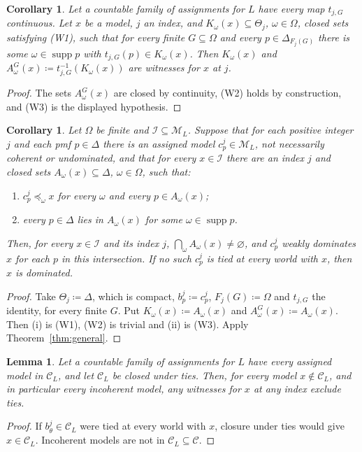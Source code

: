 \documentclass[11pt]{article}
\newtheorem{lemma}[theorem]{Lemma}
\newtheorem{corollary}[theorem]{Corollary}
\theoremstyle{definition}
\theoremstyle{remark}
\newcommand{\M}{\mathcal M}
\newcommand{\C}{\mathcal C}
\newcommand{\I}{\mathcal I}
\newcommand{\supp}{\operatorname{supp}}
\begin{document}
\begin{corollary}\label{cor:inverse}
Let a countable family of assignments for $L$ have every map $t_{j,G}$ continuous. Let $x$ be a model, $j$ an index, and $K_\omega(x)\subseteq\Theta_j$, $\omega\in\Omega$, closed sets satisfying (W1), such that for every finite $G\subseteq\Omega$ and every $p\in\Delta_{F_j(G)}$ there is some $\omega\in\supp p$ with $t_{j,G}(p)\in K_\omega(x)$. Then $K_\omega(x)$ and $A^G_\omega(x)\coloneqq t_{j,G}^{-1}(K_\omega(x))$ are witnesses for $x$ at $j$.
\end{corollary}
\begin{proof}
The sets $A^G_\omega(x)$ are closed by continuity, (W2) holds by construction, and (W3) is the displayed hypothesis.
\end{proof}

\begin{corollary}\label{cor:finite}
Let $\Omega$ be finite and $\I\subseteq\M_L$. Suppose that for each positive integer $j$ and each pmf $p\in\Delta$ there is an assigned model $c^j_p\in\M_L$, not necessarily coherent or undominated, and that for every $x\in\I$ there are an index $j$ and closed sets $A_\omega(x)\subseteq\Delta$, $\omega\in\Omega$, such that:
\begin{enumerate}[label=(\roman*)]
\item $c^j_p\preceq_\omega x$ for every $\omega$ and every $p\in A_\omega(x)$;
\item every $p\in\Delta$ lies in $A_\omega(x)$ for some $\omega\in\supp p$.
\end{enumerate}
Then, for every $x\in\I$ and its index $j$, $\bigcap_\omega A_\omega(x)\ne\varnothing$, and $c^j_p$ weakly dominates $x$ for each $p$ in this intersection. If no such $c^j_p$ is tied at every world with $x$, then $x$ is dominated.
\end{corollary}
\begin{proof}
Take $\Theta_j\coloneqq\Delta$, which is compact, $b^j_p\coloneqq c^j_p$, $F_j(G)\coloneqq\Omega$ and $t_{j,G}$ the identity, for every finite $G$. Put $K_\omega(x)\coloneqq A_\omega(x)$ and $A^G_\omega(x)\coloneqq A_\omega(x)$. Then (i) is (W1), (W2) is trivial and (ii) is (W3). Apply Theorem~\ref{thm:general}.
\end{proof}

\begin{lemma}\label{lem:tie-sufficient}
Let a countable family of assignments for $L$ have every assigned model in $\C_L$, and let $\C_L$ be closed under ties. Then, for every model $x\notin\C_L$, and in particular every incoherent model, any witnesses for $x$ at any index exclude ties.
\end{lemma}
\begin{proof}
If $b^j_\theta\in\C_L$ were tied at every world with $x$, closure under ties would give $x\in\C_L$. Incoherent models are not in $\C_L\subseteq\C$.
\end{proof}
\end{document}
